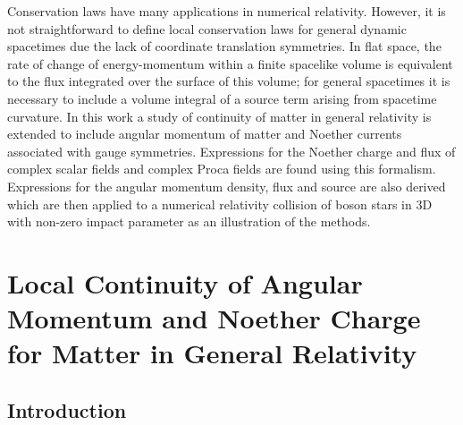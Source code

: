 

Conservation laws have many applications in numerical relativity. However, it is not straightforward to define local conservation laws for general dynamic spacetimes due the lack of coordinate translation symmetries. In flat space, the rate of change of energy-momentum within a finite spacelike volume is equivalent to the flux integrated over the surface of this volume; for general spacetimes it is necessary to include a volume integral of a source term arising from spacetime curvature. In this work a study of continuity of matter in general relativity is extended to include angular momentum of matter and Noether currents associated with gauge symmetries. Expressions for the Noether charge and flux of complex scalar fields and complex Proca fields are found using this formalism. Expressions for the angular momentum density, flux and source are also derived which are then applied to a numerical relativity collision of boson stars in 3D with non-zero impact parameter as an illustration of the methods.








\section{Local Continuity of Angular Momentum and Noether Charge for Matter in General Relativity}





\subsection{Introduction} \label{q:sect:intro}

